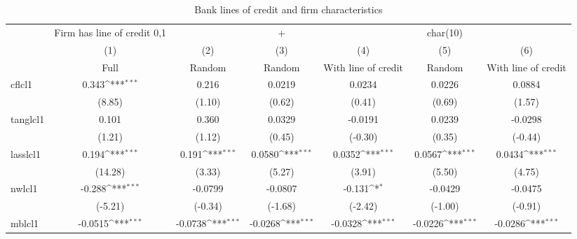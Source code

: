 \begin{table}[htbp]\centering
\def\sym#1{\ifmmode^{#1}\else\(^{#1}\)\fi}
\caption{Bank lines of credit and firm characteristics\label{tab3}}
\begin{tabular}{l*{6}{c}}
\toprule
                    &Firm has line of credit {0,1}         &                     &           +         &                     &    char(10)         &                     \\
                    &\multicolumn{1}{c}{(1)}&\multicolumn{1}{c}{(2)}&\multicolumn{1}{c}{(3)}&\multicolumn{1}{c}{(4)}&\multicolumn{1}{c}{(5)}&\multicolumn{1}{c}{(6)}\\
                    &\multicolumn{1}{c}{Full}&\multicolumn{1}{c}{Random}&\multicolumn{1}{c}{Random}&\multicolumn{1}{c}{With line of credit}&\multicolumn{1}{c}{Random}&\multicolumn{1}{c}{With line of credit}\\
\midrule
cflcl1              &       0.343\sym{***}&       0.216         &      0.0219         &      0.0234         &      0.0226         &      0.0884         \\
                    &      (8.85)         &      (1.10)         &      (0.62)         &      (0.41)         &      (0.69)         &      (1.57)         \\
\addlinespace
tanglcl1            &       0.101         &       0.360         &      0.0329         &     -0.0191         &      0.0239         &     -0.0298         \\
                    &      (1.21)         &      (1.12)         &      (0.45)         &     (-0.30)         &      (0.35)         &     (-0.44)         \\
\addlinespace
lasslcl1            &       0.194\sym{***}&       0.191\sym{***}&      0.0580\sym{***}&      0.0352\sym{***}&      0.0567\sym{***}&      0.0434\sym{***}\\
                    &     (14.28)         &      (3.33)         &      (5.27)         &      (3.91)         &      (5.50)         &      (4.75)         \\
\addlinespace
nwlcl1              &      -0.288\sym{***}&     -0.0799         &     -0.0807         &      -0.131\sym{*}  &     -0.0429         &     -0.0475         \\
                    &     (-5.21)         &     (-0.34)         &     (-1.68)         &     (-2.42)         &     (-1.00)         &     (-0.91)         \\
\addlinespace
mblcl1              &     -0.0515\sym{***}&     -0.0738\sym{***}&     -0.0268\sym{***}&     -0.0328\sym{***}&     -0.0226\sym{***}&     -0.0286\sym{***}\\

\end{tabular}
\end{table}
